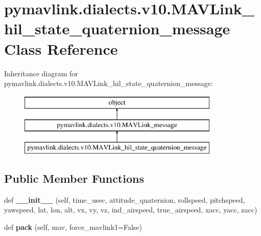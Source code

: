 \hypertarget{classpymavlink_1_1dialects_1_1v10_1_1MAVLink__hil__state__quaternion__message}{}\section{pymavlink.\+dialects.\+v10.\+M\+A\+V\+Link\+\_\+hil\+\_\+state\+\_\+quaternion\+\_\+message Class Reference}
\label{classpymavlink_1_1dialects_1_1v10_1_1MAVLink__hil__state__quaternion__message}
Inheritance diagram for pymavlink.\+dialects.\+v10.\+M\+A\+V\+Link\+\_\+hil\+\_\+state\+\_\+quaternion\+\_\+message\+:\begin{figure}[H]
\begin{center}
\leavevmode
\includegraphics[height=3.000000cm]{classpymavlink_1_1dialects_1_1v10_1_1MAVLink__hil__state__quaternion__message}
\end{center}
\end{figure}
\subsection*{Public Member Functions}
\begin{DoxyCompactItemize}
\item 
\mbox{\label{classpymavlink_1_1dialects_1_1v10_1_1MAVLink__hil__state__quaternion__message_a8d662e63cead9b35b86bdf9802552fcb}} 
def {\bfseries \+\_\+\+\_\+init\+\_\+\+\_\+} (self, time\+\_\+usec, attitude\+\_\+quaternion, rollspeed, pitchspeed, yawspeed, lat, lon, alt, vx, vy, vz, ind\+\_\+airspeed, true\+\_\+airspeed, xacc, yacc, zacc)
\item 
\mbox{\label{classpymavlink_1_1dialects_1_1v10_1_1MAVLink__hil__state__quaternion__message_ae496054d521a4e6865606e339c8ff3c8}} 
def {\bfseries pack} (self, mav, force\+\_\+mavlink1=False)
\end{DoxyCompactItemize}
